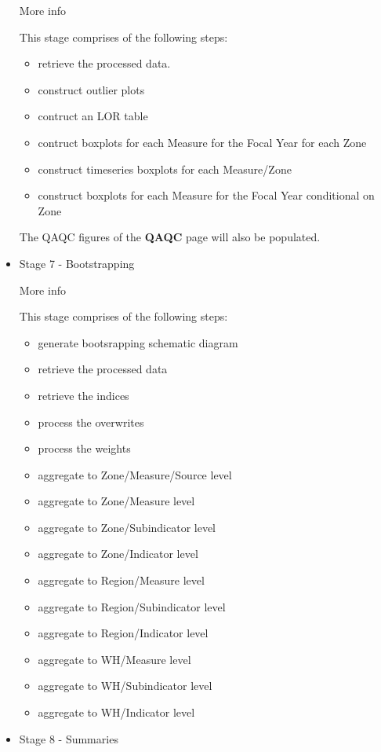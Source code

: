 \documentclass[
  8pt,
  a4paper]{article}
\providecommand{\tightlist}{%
  \setlength{\itemsep}{0pt}\setlength{\parskip}{0pt}}
\begin{document}
\begin{itemize}
  More info

  This stage comprises of the following steps:

  \begin{itemize}
  \tightlist
  \item
    retrieve the processed data.
  \item
    construct outlier plots
  \item
    contruct an LOR table
  \item
    contruct boxplots for each Measure for the Focal Year for each Zone
  \item
    construct timeseries boxplots for each Measure/Zone
  \item
    construct boxplots for each Measure for the Focal Year conditional
    on Zone
  \end{itemize}

  The QAQC figures of the \textbf{QAQC} page will also be populated.
\item
  Stage 7 - Bootstrapping

  More info

  This stage comprises of the following steps:

  \begin{itemize}
  \tightlist
  \item
    generate bootsrapping schematic diagram
  \item
    retrieve the processed data
  \item
    retrieve the indices
  \item
    process the overwrites
  \item
    process the weights
  \item
    aggregate to Zone/Measure/Source level
  \item
    aggregate to Zone/Measure level
  \item
    aggregate to Zone/Subindicator level
  \item
    aggregate to Zone/Indicator level
  \item
    aggregate to Region/Measure level
  \item
    aggregate to Region/Subindicator level
  \item
    aggregate to Region/Indicator level
  \item
    aggregate to WH/Measure level
  \item
    aggregate to WH/Subindicator level
  \item
    aggregate to WH/Indicator level
  \end{itemize}
\item
  Stage 8 - Summaries


\end{itemize}
\end{document}

